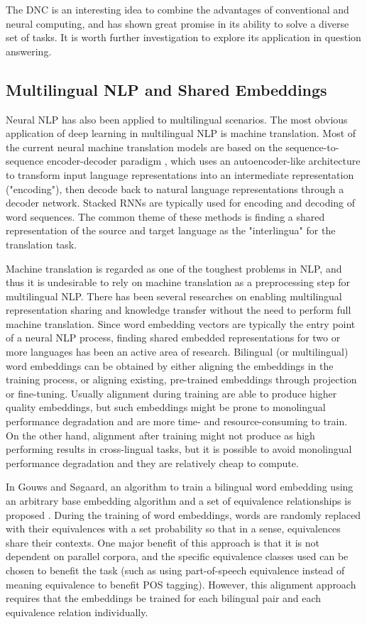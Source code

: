 \documentclass[]{article}
\begin{document}
The DNC is an interesting idea to combine the advantages of conventional and neural computing, and has shown great promise in its ability to solve a diverse set of tasks. It is worth further investigation to explore its application in question answering.

\subsection{Multilingual NLP and Shared Embeddings}

Neural NLP has also been applied to multilingual scenarios. The most obvious application of deep learning in multilingual NLP is machine translation. Most of the current neural machine translation models are based on the sequence-to-sequence encoder-decoder paradigm \cite{kalchbrenner2013recurrent, cho2014properties}, which uses an autoencoder-like architecture to transform input language representations into an intermediate representation ("encoding"), then decode back to natural language representations through a decoder network. Stacked RNNs are typically used for encoding and decoding of word sequences. The common theme of these methods is finding a shared representation of the source and target language as the "interlingua" for the translation task.

Machine translation is regarded as one of the toughest problems in NLP, and thus it is undesirable to rely on machine translation as a preprocessing step for multilingual NLP. There has been several researches on enabling multilingual representation sharing and knowledge transfer without the need to perform full machine translation. Since word embedding vectors are typically the entry point of a neural NLP process, finding shared embedded representations for two or more languages has been an active area of research. Bilingual (or multilingual) word embeddings can be obtained by either aligning the embeddings in the training process, or aligning existing, pre-trained embeddings through projection or fine-tuning. Usually alignment during training are able to produce higher quality embeddings, but such embeddings might be prone to monolingual performance degradation and are more time- and resource-consuming to train. On the other hand, alignment after training might not produce as high performing results in cross-lingual tasks, but it is possible to avoid monolingual performance degradation and they are relatively cheap to compute.

In Gouws and S{\o}gaard, an algorithm to train a bilingual word embedding using an arbitrary base embedding algorithm and a set of equivalence relationships is proposed \cite{gouws2015simple}. During the training of word embeddings, words are randomly replaced with their equivalences with a set probability so that in a sense, equivalences share their contexts. One major benefit of this approach is that it is not dependent on parallel corpora, and the specific equivalence classes used can be chosen to benefit the task (such as using part-of-speech equivalence instead of meaning equivalence to benefit POS tagging)\cite{gouws2015simple}. However, this alignment approach requires that the embeddings be trained for each bilingual pair and each equivalence relation individually.
\end{document}
